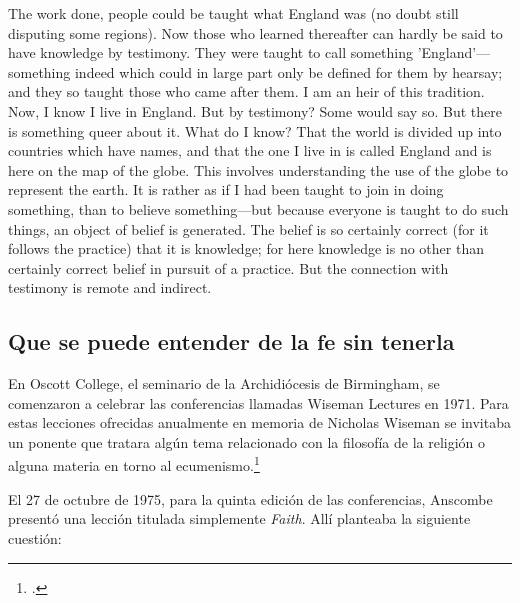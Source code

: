 The work done, people could be taught what England was (no doubt still disputing
some regions). Now those who learned thereafter can hardly be said to have
knowledge by testimony. They were taught to call something 'England’—something
indeed which could in large part only be defined for them by hearsay; and they
so taught those who came after them. I am an heir of this tradition. Now, I know
I live in England. But by testimony? Some would say so. But there is something
queer about it. What do I know? That the world is divided up into countries
which have names, and that the one I live in is called England and is here on
the map of the globe. This involves understanding the use of the globe to
represent the earth. It is rather as if I had been taught to join in doing
something, than to believe something—but because everyone is taught to do such
things, an object of belief is generated. The belief is so certainly correct
(for it follows the practice) that it is knowledge; for here knowledge is no
other than certainly correct belief in pursuit of a practice. But the connection
with testimony is remote and indirect.

\subsection{Que se puede entender de la fe sin tenerla}
En Oscott College, el seminario de la Archidiócesis de Birmingham, se comenzaron
a celebrar las conferencias llamadas Wiseman Lectures en 1971. Para estas
lecciones ofrecidas anualmente en memoria de Nicholas Wiseman se invitaba un
ponente que tratara algún tema relacionado con la filosofía de la religión o
alguna materia en torno al ecumenismo.\footcite[Cf.~][7]{wisemanlects}

El 27 de octubre de 1975, para la quinta edición de las conferencias, Anscombe
presentó una lección titulada simplemente \emph{Faith}. Allí planteaba la
siguiente cuestión: 

